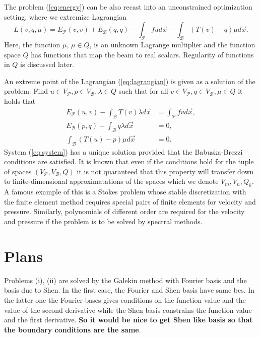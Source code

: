 \documentclass[a4paper,10pt]{article}
\newcommand{\Vp}{\ensuremath{V_{\mathcal{P}}}}
\newcommand{\Vb}{\ensuremath{V_{\mathcal{B}}}}
\newcommand{\Ep}{\ensuremath{E_{\mathcal{P}}}}
\newcommand{\Eb}{\ensuremath{E_{\mathcal{B}}}}
\begin{document}
  The problem (\ref{eq:energy}) can be also recast into an unconstrained
  optimization setting, where we extremize Lagrangian
  \begin{equation}
    \label{eq:lagrangian}
    L(v, q, \mu) = \Ep(v, v) + \Eb(q, q) - \int_{\mathcal{P}}f u d\vec{x} -
  \int_{\mathcal{B}}(T(v) - q)\mu d\vec{x}.
  \end{equation}
  Here, the function $\mu$, $\mu\in Q$, is an unknown Lagrange multiplier
  and the function space $Q$ has functions that map the beam to real scalars.
  Regularity of functions in $Q$ is discussed later.

  An extreme point of the Lagrangian (\ref{eq:lagrangian}) is given as a
  solution of the problem: Find $u\in\Vp, p\in\Vb, \lambda\in Q$ such that
  for all $v\in\Vp, q\in\Vb, \mu\in Q$ it holds that
 \begin{equation}
    \label{eq:system}
    \begin{aligned}
      \Ep(u, v) - \int_{\mathcal{B}}T(v)\lambda d\vec{x} &= \int_{\mathcal{P}}fvd\vec{x}, \\
      \Eb(p, q) - \int_{\mathcal{B}}q\lambda d\vec{x} &= 0, \\
      \int_{\mathcal{B}}(T(u)-p)\mu d\vec{x} &= 0.
    \end{aligned}
  \end{equation}
  System (\ref{eq:system}) has a unique solution provided that the
  Babuska-Brezzi conditions are satisfied. It is known that even if the
  conditions hold for the tuple of spaces $(\Vp, \Vb, Q)$ it is not quaranteed
  that this property will transfer down to finite-dimensional approximatations
  of the spaces which we denote $V_m, V_n, Q_k$. A famous example of this
  is a Stokes problem whose stable discretization with the finite element method
  requires special pairs of finite elements for velocity and pressure.
  Similarly, polynomials of different order are required for the velocity and
  pressure if the problem is to be solved by spectral methods.

  \section{Plans}

  Problems (i), (ii) are solved by the Galekin method with Fourier basis and
  the basis due to Shen. In the first case, the Fourier and Shen basis have
  same bcs. In the latter one the Fourier bases gives conditions on the function
  value and the value of the second derivative while the Shen basis constrains
  the function value and the first derivative. \textbf{So it would be nice to 
  get Shen like basis so that the boundary conditions are the same}.
\end{document}
